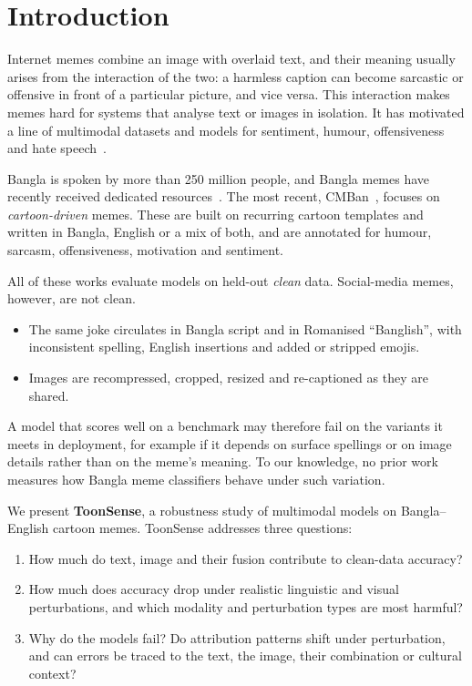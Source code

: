 \section{Introduction}
\label{sec:intro}

Internet memes combine an image with overlaid text, and their meaning usually arises from the interaction of the
two: a harmless caption can become sarcastic or offensive in front of a particular picture, and vice versa. This
interaction makes memes hard for systems that analyse text or images in isolation. It has motivated a line of
multimodal datasets and models for sentiment, humour, offensiveness and hate
speech~\cite{kiela2020hateful,sharma2020memotion}.

Bangla is spoken by more than 250 million people, and Bangla memes have recently received dedicated
resources~\cite{hossain2022memosen,hossain2022mute,das2023banglaabusememe,hossain2024bhm}. The most recent,
CMBan~\cite{cmban2025}, focuses on \emph{cartoon-driven} memes. These are built on recurring cartoon templates and
written in Bangla, English or a mix of both, and are annotated for humour, sarcasm, offensiveness, motivation and
sentiment.

All of these works evaluate models on held-out \emph{clean} data. Social-media memes, however, are not clean.
\begin{itemize}
  \item The same joke circulates in Bangla script and in Romanised ``Banglish'', with inconsistent spelling,
  English insertions and added or stripped emojis.
  \item Images are recompressed, cropped, resized and re-captioned as they are shared.
\end{itemize}
A model that scores well on a benchmark may therefore fail on the variants it meets in deployment, for example if
it depends on surface spellings or on image details rather than on the meme's meaning. To our knowledge, no prior
work measures how Bangla meme classifiers behave under such variation.

We present \textbf{ToonSense}, a robustness study of multimodal models on Bangla--English cartoon memes. ToonSense
addresses three questions:
\begin{enumerate}
  \item[\textbf{Q1}] How much do text, image and their fusion contribute to clean-data accuracy?
  \item[\textbf{Q2}] How much does accuracy drop under realistic linguistic and visual perturbations, and which
  modality and perturbation types are most harmful?
  \item[\textbf{Q3}] Why do the models fail? Do attribution patterns shift under perturbation, and can errors be
  traced to the text, the image, their combination or cultural context?
\end{enumerate}

